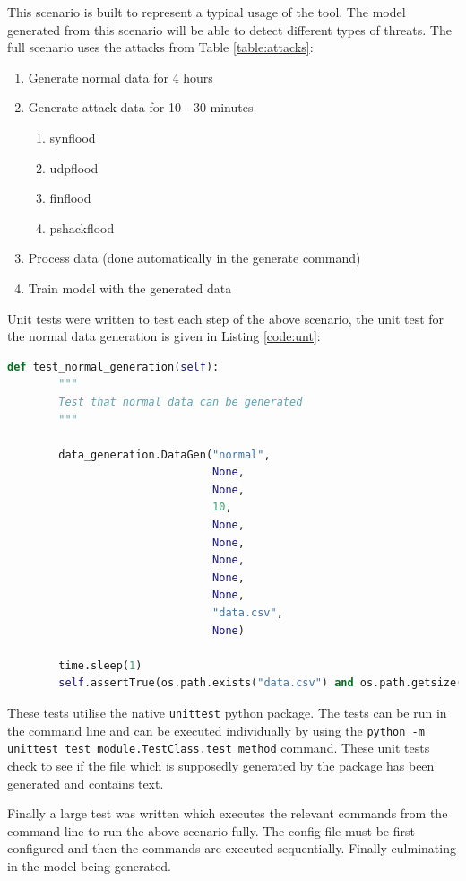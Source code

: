 This scenario is built to represent a typical usage of the tool. The model generated from this scenario will be able to detect different types of threats. The full scenario uses the attacks from Table \ref{table:attacks}:
\begin{enumerate}
    \item Generate normal data for 4 hours
    \item Generate attack data for 10 - 30 minutes
    \begin{enumerate}
        \item synflood
        \item udpflood
        \item finflood
        \item pshackflood
    \end{enumerate}
    \item Process data (done automatically in the generate command)
    \item Train model with the generated data
\end{enumerate}
Unit tests were written to test each step of the above scenario, the unit test for the normal data generation is given in Listing \ref{code:unt}:
\begin{lstlisting}[language = python, caption = Normal Data Unit Test, label=code:unt]
def test_normal_generation(self):
        """
        Test that normal data can be generated
        """

        data_generation.DataGen("normal",
                                None,
                                None,
                                10,
                                None,
                                None,
                                None,
                                None,
                                None,
                                "data.csv",
                                None)
        
        time.sleep(1)
        self.assertTrue(os.path.exists("data.csv") and os.path.getsize("data.csv") > 0)
\end{lstlisting}

These tests utilise the native \texttt{unittest} python package. The tests can be run in the command line and can be executed individually by using the \texttt{python -m unittest test\_module.TestClass.test\_method} command. These unit tests check to see if the file which is supposedly generated by the package has been generated and contains text. 

Finally a large test was written which executes the relevant commands from the command line to run the above scenario fully. The config file must be first configured and then the commands are executed sequentially. Finally culminating in the model being generated.
